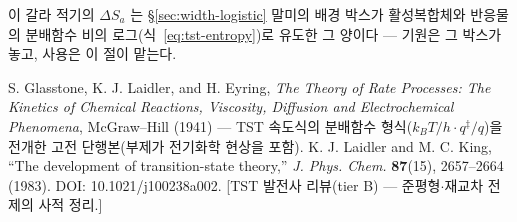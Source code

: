 이 갈라 적기의 $\Delta S_a$ 는 \S\ref{sec:width-logistic} 말미의 배경 박스가 활성복합체와
반응물의 분배함수 비의 로그(식~\eqref{eq:tst-entropy})로 유도한 그 양이다 --- 기원은 그 박스가
놓고, 사용은 이 절이 맡는다.


 S. Glasstone, K. J. Laidler, and H. Eyring, \emph{The Theory of Rate
Processes: The Kinetics of Chemical Reactions, Viscosity, Diffusion and Electrochemical
Phenomena}, McGraw--Hill (1941) --- TST 속도식의 분배함수 형식($k_BT/h\cdot q^\ddagger/q$)을
전개한 고전 단행본(부제가 전기화학 현상을 포함).
 K. J. Laidler and M. C. King, ``The development of transition-state
theory,'' \emph{J. Phys. Chem.} \textbf{87}(15), 2657--2664 (1983). DOI: 10.1021/j100238a002.
[TST 발전사 리뷰(tier B) --- 준평형$\cdot$재교차 전제의 사적 정리.]

